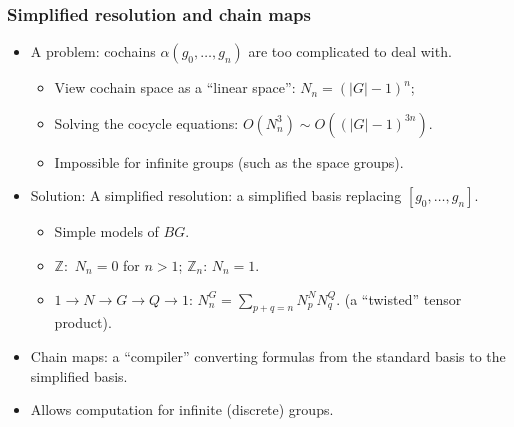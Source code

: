 \documentclass[xcolor=table, aspectratio=169]{beamer}
\begin{document}
\begin{frame}
  \frametitle{Simplified resolution and chain maps}
  \begin{itemize}
  \item A problem: cochains $\alpha(g_0,\ldots,g_n)$ are too complicated to deal with.
    \begin{itemize}
    \item View cochain space as a ``linear space'': $N_n = (|G|-1)^n$;
    \item Solving the cocycle equations: $O(N_n^3)\sim O((|G|-1)^{3n})$.
    \item Impossible for infinite groups (such as the space groups).
    \end{itemize}
  \item Solution: A simplified resolution: a simplified basis replacing $[g_0,\ldots,g_n]$.
    \begin{itemize}
    \item Simple models of $BG$.
    \item $\mathbb Z:$ $N_n=0$ for $n>1$; $\mathbb Z_n$: $N_n=1$.
    \item $1\rightarrow N\rightarrow G\rightarrow Q\rightarrow1$: $N_n^G=\sum_{p+q=n}N_p^NN_q^Q.$ (a ``twisted'' tensor product).
    \end{itemize}
  \item Chain maps: a ``compiler'' converting formulas from the standard basis to the simplified basis.
  \item Allows computation for infinite (discrete) groups.
  \end{itemize}
\end{frame}
\end{document}
